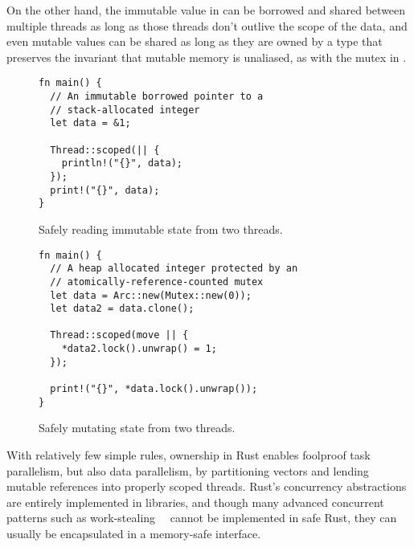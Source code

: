 On the other hand, the immutable value in  can be borrowed and shared between multiple threads as long as those threads don't outlive the scope of the data, and even mutable values can be shared as long
as they are owned by a type that preserves the invariant that mutable memory is unaliased, as with the
mutex in .

\begin{figure}
\begin{lstlisting}
fn main() {
  // An immutable borrowed pointer to a
  // stack-allocated integer
  let data = &1;

  Thread::scoped(|| {
    println!("{}", data);
  });
  print!("{}", data);
}
\end{lstlisting}
  \caption{Safely reading immutable state from two threads.}
  \label{fig:shared-concurrency}
\end{figure}

\begin{figure}
\begin{lstlisting}
fn main() {
  // A heap allocated integer protected by an
  // atomically-reference-counted mutex
  let data = Arc::new(Mutex::new(0));
  let data2 = data.clone();

  Thread::scoped(move || {
    *data2.lock().unwrap() = 1;
  });

  print!("{}", *data.lock().unwrap());
}
\end{lstlisting}
  \caption{Safely mutating state from two threads.}
  \label{fig:shared-mutable-concurrency}
\end{figure}

With relatively few simple rules, ownership in Rust enables foolproof task parallelism,
but also data parallelism, by partitioning vectors and lending mutable references into properly scoped threads.
Rust's concurrency abstractions are entirely implemented in libraries, and though
many advanced concurrent patterns such as work-stealing~~\cite{blumeofe:multiprogrammed-work-stealing}
cannot be implemented in safe Rust, they can usually be encapsulated in a memory-safe interface.

